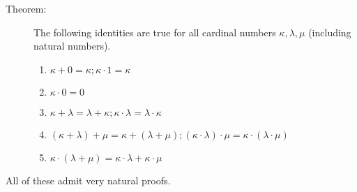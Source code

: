 \documentclass[12pt]{book}
\begin{document}
\begin{description}

\item[Theorem:] The following identities are true for all cardinal
numbers $\kappa,\lambda,\mu$ (including natural numbers).

\begin{enumerate}

\item $\kappa+0 = \kappa;\kappa\cdot 1 = \kappa$

\item $\kappa\cdot 0 = 0$

\item $\kappa+\lambda = \lambda+\kappa; \kappa\cdot\lambda = \lambda\cdot\kappa$

\item $(\kappa+\lambda)+\mu = \kappa+(\lambda+\mu); (\kappa\cdot\lambda)\cdot\mu=\kappa\cdot(\lambda\cdot\mu)$

\item $\kappa\cdot(\lambda+\mu)=\kappa\cdot\lambda+\kappa\cdot\mu$

\end{enumerate}

\end{description}

All of these admit very natural proofs.
\end{document}
